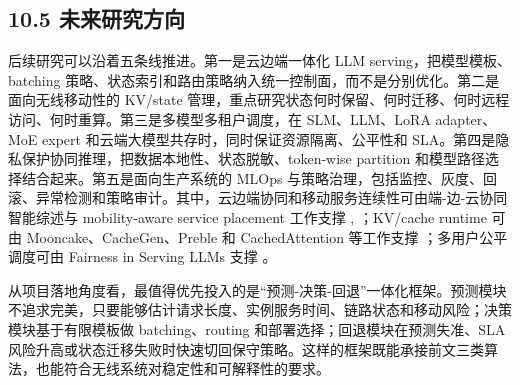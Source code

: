 \subsection*{10.5 未来研究方向}

后续研究可以沿着五条线推进。第一是云边端一体化 LLM serving，把模型模板、batching 策略、状态索引和路由策略纳入统一控制面，而不是分别优化。第二是面向无线移动性的 KV/state 管理，重点研究状态何时保留、何时迁移、何时远程访问、何时重算。第三是多模型多租户调度，在 SLM、LLM、LoRA adapter、MoE expert 和云端大模型共存时，同时保证资源隔离、公平性和 SLA。第四是隐私保护协同推理，把数据本地性、状态脱敏、token-wise partition 和模型路径选择结合起来。第五是面向生产系统的 MLOps 与策略治理，包括监控、灰度、回滚、异常检测和策略审计。其中，云边端协同和移动服务连续性可由端-边-云协同智能综述与 mobility-aware service placement 工作支撑 \cite{duan2022distributed}, \cite{ouyang2018follow}；KV/cache runtime 可由 Mooncake、CacheGen、Preble 和 CachedAttention 等工作支撑 \cite{qin2025mooncake,liu2024cachegen,srivatsa2025preble,gao2024cost}；多用户公平调度可由 Fairness in Serving LLMs 支撑 \cite{sheng2024fairness}。

从项目落地角度看，最值得优先投入的是“预测-决策-回退”一体化框架。预测模块不追求完美，只要能够估计请求长度、实例服务时间、链路状态和移动风险；决策模块基于有限模板做 batching、routing 和部署选择；回退模块在预测失准、SLA 风险升高或状态迁移失败时快速切回保守策略。这样的框架既能承接前文三类算法，也能符合无线系统对稳定性和可解释性的要求。


